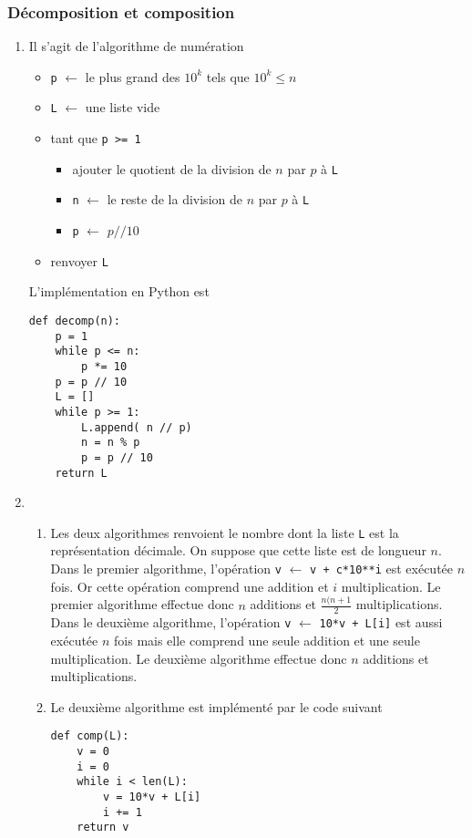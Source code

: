 \subsubsection{Décomposition et composition}
\begin{enumerate}
  \item Il s'agit de l'algorithme de numération
\begin{itemize}
  \item \verb|p| $\longleftarrow$ le plus grand des $10^k$ tels que $ 10^k \leq n$
  \item \verb|L| $\longleftarrow$ une liste vide
  \item tant que \verb|p >= 1|
  \begin{itemize}
    \item ajouter le quotient de la division de $n$ par $p$ à \verb|L|
    \item \verb|n| $\longleftarrow$ le reste de la division de $n$ par $p$ à \verb|L|
    \item \verb|p| $\longleftarrow$ $p// 10$
  \end{itemize}
  \item renvoyer \verb|L|
\end{itemize}
L'implémentation en Python est
\begin{verbatim}
def decomp(n):
    p = 1
    while p <= n:
        p *= 10
    p = p // 10
    L = []
    while p >= 1:
        L.append( n // p)
        n = n % p
        p = p // 10
    return L
\end{verbatim}
\item
\begin{enumerate}
  \item Les deux algorithmes renvoient le nombre dont la liste \verb|L| est la représentation décimale. On suppose que cette liste est de longueur $n$.\newline
  Dans le premier algorithme, l'opération \verb|v| $\longleftarrow$ \verb|v + c*10**i| est exécutée $n$ fois. Or cette opération comprend une addition et $i$ multiplication. Le premier algorithme effectue donc $n$ additions et $\frac{n(n+1}{2}$ multiplications.\newline
  Dans le deuxième algorithme, l'opération \verb|v| $\longleftarrow$ \verb|10*v + L[i]| est aussi exécutée $n$ fois mais elle comprend une seule addition et une seule multiplication. Le deuxième algorithme effectue donc $n$ additions et multiplications.  
  \item Le deuxième algorithme est implémenté par le code suivant
\begin{verbatim}
def comp(L):
    v = 0
    i = 0
    while i < len(L):
        v = 10*v + L[i]
        i += 1
    return v
\end{verbatim}
\end{enumerate}

\end{enumerate}

